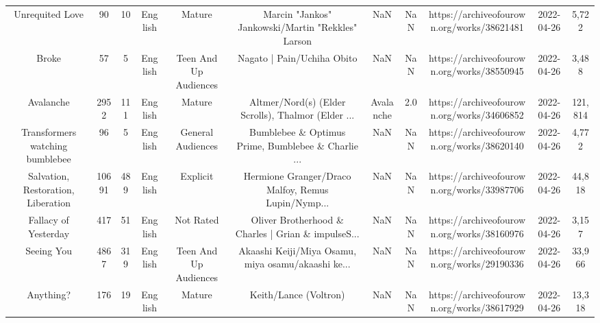 \begin{table}[h!]
{\begin{tabular}{|c|c|c|c|c|c|c|c|c|c|c|}
                                   Unrequited Love &     90 &    10 &  English &                Mature &  Marcin "Jankos" Jankowski/Martin "Rekkles" Larson &                                                NaN &   NaN & https://archiveofourown.org/works/38621481 & 2022-04-26 &     5,722 \\
                                             Broke &     57 &     5 &  English & Teen And Up Audiences &                         Nagato | Pain/Uchiha Obito &                                                NaN &   NaN & https://archiveofourown.org/works/38550945 & 2022-04-26 &     3,488 \\
                                         Avalanche &   2952 &   111 &  English &                Mature & Altmer/Nord(s) (Elder Scrolls), Thalmor (Elder ... &                                          Avalanche &   2.0 & https://archiveofourown.org/works/34606852 & 2022-04-26 &   121,814 \\
                   Transformers watching bumblebee &     96 &     5 &  English &     General Audiences & Bumblebee \& Optimus Prime, Bumblebee \& Charlie ... &                                                NaN &   NaN & https://archiveofourown.org/works/38620140 & 2022-04-26 &     4,772 \\
                Salvation, Restoration, Liberation &  10691 &   489 &  English &              Explicit & Hermione Granger/Draco Malfoy, Remus Lupin/Nymp... &                                                NaN &   NaN & https://archiveofourown.org/works/33987706 & 2022-04-26 &    44,818 \\
                              Fallacy of Yesterday &    417 &    51 &  English &             Not Rated & Oliver Brotherhood \& Charles | Grian \& impulseS... &                                                NaN &   NaN & https://archiveofourown.org/works/38160976 & 2022-04-26 &     3,157 \\
                                        Seeing You &   4867 &   319 &  English & Teen And Up Audiences & Akaashi Keiji/Miya Osamu, miya osamu/akaashi ke... &                                                NaN &   NaN & https://archiveofourown.org/works/29190336 & 2022-04-26 &    33,966 \\
                                         Anything? &    176 &    19 &  English &                Mature &                              Keith/Lance (Voltron) &                                                NaN &   NaN & https://archiveofourown.org/works/38617929 & 2022-04-26 &    13,318 \\

\end{tabular}}
\end{table}
